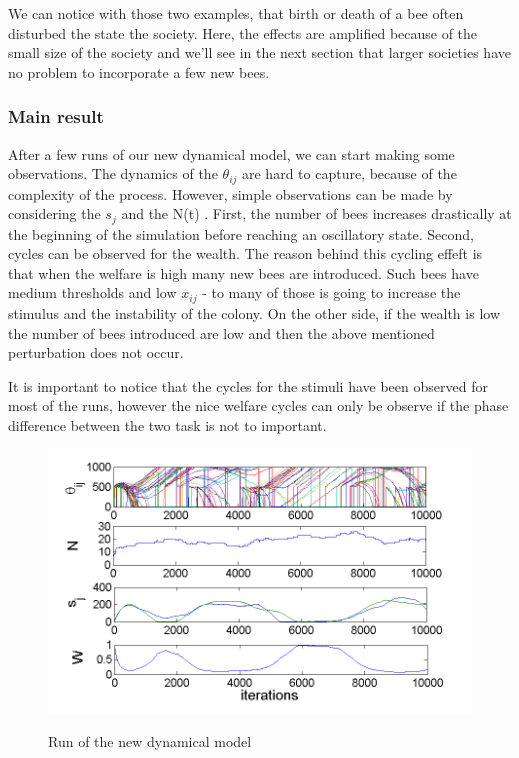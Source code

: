 We can notice with those two examples, that birth or death of a bee
often disturbed the state the society. Here, the effects are amplified
because of the small size of the society and we'll see in the next
section that larger societies have no problem to incorporate a few
new bees.


\subsubsection{Main result}

After a few runs of our new dynamical model, we can start making some observations. The dynamics of the $\theta_{ij}$ are hard to capture,
because of the complexity of the process. However, simple observations
can be made by considering the $s_{j}$ and the N(t) . First, the
number of bees increases drastically at the beginning of the simulation
before reaching an oscillatory state. Second, cycles can be observed
for the wealth. The reason behind this cycling effeft is that when
the welfare is high many new bees are introduced. Such bees have medium
thresholds and low $x_{ij}$ - to many of those is going to increase
the stimulus and the instability of the colony. On the other side,
if the wealth is low the number of bees introduced are low and then
the above mentioned perturbation does not occur.

It is important to notice that the cycles for the stimuli have been
observed for most of the runs, however the nice welfare cycles can
only be observe if the phase difference between the two task is not
to important.

\begin{figure}[ht!]
\begin{centering}
\includegraphics[scale=0.8]{figures/Figure6.png}
\label{fig:figure8}
\par\end{centering}

\begin{centering}
\caption{Run of the new dynamical model}

\par\end{centering}

\end{figure}



